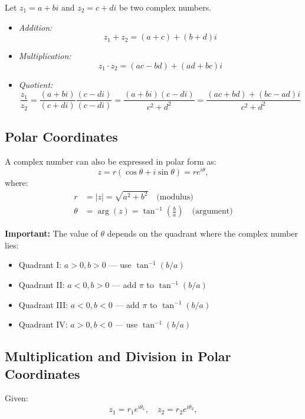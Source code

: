 Let \( z_1 = a + bi \) and \( z_2 = c + di \) be two complex numbers.

\begin{itemize}[label=\(-\)]
	\item \emph{Addition:}
	      \[
		      z_1 + z_2 = (a + c) + (b + d)i
	      \]

	\item \emph{Multiplication:}
	      \[
		      z_1 \cdot z_2 = (ac - bd) + (ad + bc)i
	      \]

	\item \emph{Quotient:}
	      \[
		      \frac{z_1}{z_2} = \frac{(a + bi)}{(c + di)} \frac{(c - di)}{(c - di)} = \frac{(a + bi)(c - di)}{c^2 + d^2} = \frac{(ac + bd) + (bc - ad)i}{c^2 + d^2}
	      \]
\end{itemize}

\subsection{Polar Coordinates}

A complex number can also be expressed in polar form as:
\[
	z = r(\cos \theta + i \sin \theta) = re^{i\theta},
\]
where:
\begin{align*}
	r      & = |z| = \sqrt{a^2 + b^2} \quad \text{(modulus)}                       \\
	\theta & = \arg(z) = \tan^{-1}\left(\frac{b}{a}\right) \quad \text{(argument)}
\end{align*}

\textbf{Important:} The value of \( \theta \) depends on the quadrant where the complex number lies:

\begin{itemize}[label=\(-\)]
	\item Quadrant I: \( a > 0, b > 0 \) — use \( \tan^{-1}(b/a) \)
	\item Quadrant II: \( a < 0, b > 0 \) — add \( \pi \) to \( \tan^{-1}(b/a) \)
	\item Quadrant III: \( a < 0, b < 0 \) — add \( \pi \) to \( \tan^{-1}(b/a) \)
	\item Quadrant IV: \( a > 0, b < 0 \) — use \( \tan^{-1}(b/a) \)
\end{itemize}

\subsection{Multiplication and Division in Polar Coordinates}

Given:
\[
	z_1 = r_1 e^{i\theta_1}, \quad z_2 = r_2 e^{i\theta_2},
\]

